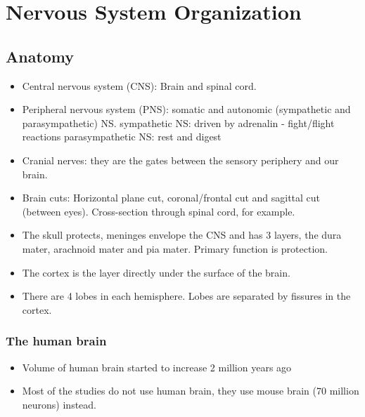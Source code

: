 \documentclass[main]{subfiles}
\begin{document}

\section{Nervous System Organization}
\subsection{Anatomy}
\begin{itemize}[noitemsep,nolistsep]
	\item Central nervous system (CNS): Brain and spinal cord.
	\item Peripheral nervous system (PNS): somatic and autonomic (sympathetic and parasympathetic) NS.
	\subitem sympathetic NS: driven by adrenalin - fight/flight reactions
	\subitem parasympathetic NS: rest and digest
	\item Cranial nerves: they are the gates between the sensory periphery and our brain.
	\item Brain cuts: Horizontal plane cut, coronal/frontal cut and sagittal cut (between eyes). Cross-section through spinal cord, for example.
	\item The skull protects, meninges envelope the CNS and has 3 layers, the dura mater, arachnoid mater and pia mater. Primary function is protection.
	\item The cortex is the layer directly under the surface of the brain.
	\item There are 4 lobes in each hemisphere. Lobes are separated by fissures in the cortex.
\end{itemize}

\subsubsection{The human brain}
\begin{itemize}
\item Volume of human brain started to increase 2 million years ago
\item Most of the studies do not use human brain, they use mouse brain (70 million neurons) instead.
\end{itemize}
\end{document}
